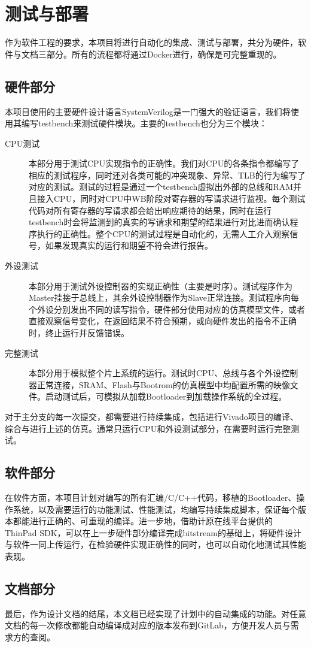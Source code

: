 \chapter{测试与部署}

作为软件工程的要求，本项目将进行自动化的集成、测试与部署，共分为硬件，软件与文档三部分。所有的流程都将通过Docker进行，确保是可完整重现的。

\section{硬件部分}
\label{section:test_hardware}

本项目使用的主要硬件设计语言SystemVerilog是一门强大的验证语言，我们将使用其编写testbench来测试硬件模块。主要的testbench也分为三个模块：

\begin{description}
    \item[CPU测试] 本部分用于测试CPU实现指令的正确性。我们对CPU的各条指令都编写了相应的测试程序，同时还对各类可能的冲突现象、异常、TLB的行为编写了对应的测试。测试的过程是通过一个testbench虚拟出外部的总线和RAM并且接入CPU，同时对CPU中WB阶段对寄存器的写请求进行监视。每个测试代码对所有寄存器的写请求都会给出响应期待的结果，同时在运行testbench时会将监测到的真实的写请求和期望的结果进行对比进而确认程序执行的正确性。整个CPU的测试过程是自动化的，无需人工介入观察信号，如果发现真实的运行和期望不符会进行报告。
    \item[外设测试] 本部分用于测试外设控制器的实现正确性（主要是时序）。测试程序作为Master挂接于总线上，其余外设控制器作为Slave正常连接。测试程序向每个外设分别发出不同的读写指令，硬件部分使用对应的仿真模型文件，或者直接观察信号变化，在返回结果不符合预期，或向硬件发出的指令不正确时，终止运行并反馈错误。
    \item[完整测试] 本部分用于模拟整个片上系统的运行。测试时CPU、总线与各个外设控制器正常连接，SRAM、Flash与Bootrom的仿真模型中均配置所需的映像文件。启动测试后，可模拟从加载Bootloader到加载操作系统的全过程。
\end{description}

对于主分支的每一次提交，都需要进行持续集成，包括进行Vivado项目的编译、综合与进行上述的仿真。通常只运行CPU和外设测试部分，在需要时运行完整测试。

\section{软件部分}

在软件方面，本项目计划对编写的所有汇编/C/C++代码，移植的Bootloader、操作系统，以及需要运行的功能测试、性能测试，均编写持续集成脚本，保证每个版本都能进行正确的、可重现的编译。进一步地，借助计原在线平台提供的 ThinPad SDK，可以在上一步硬件部分编译完成bitstream的基础上，将硬件设计与软件一同上传运行，在检验硬件实现正确性的同时，也可以自动化地测试其性能表现。

\section{文档部分}

最后，作为设计文档的结尾，本文档已经实现了计划中的自动集成的功能。对任意文档的每一次修改都能自动编译成对应的版本发布到GitLab，方便开发人员与需求方的查阅。
